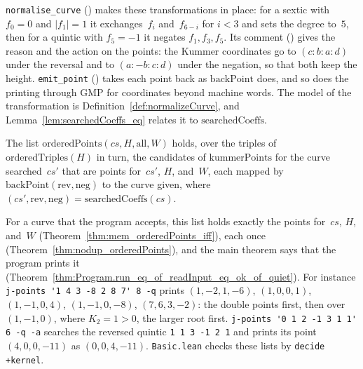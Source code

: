 \begin{remark}\label{rem:specCurveC}
  \texttt{normalise\_curve} () makes these transformations in place:
  for a sextic with $f_0 = 0$ and $|f_1| = 1$ it exchanges~$f_i$ and~$f_{6-i}$ for $i < 3$ and sets
  the degree to~$5$, then for a quintic with $f_5 = -1$ it negates $f_1, f_3, f_5$. Its comment
  () gives the reason and the action on the points: the Kummer
  coordinates go to $(c : b : a : d)$ under the reversal and to $(a : -b : c : d)$ under the
  negation, so that both keep the height. \texttt{emit\_point} ()
  takes each point back as $\mathrm{backPoint}$ does, and so does the printing through GMP for
  coordinates beyond machine words. The model of the transformation is
  Definition~\ref{def:normalizeCurve}, and Lemma~\ref{lem:searchedCoeffs_eq} relates it to
  $\mathrm{searchedCoeffs}$.
\end{remark}

\begin{definition}\label{def:orderedPoints}
  \leanok
  The list $\mathrm{orderedPoints}(cs, H, \mathrm{all}, W)$ holds, over the triples of
  $\mathrm{orderedTriples}(H)$ in turn, the candidates of $\mathrm{kummerPoints}$ for the curve
  searched~$cs'$ that are points for~$cs'$, $H$,  and~$W$, each mapped by
  $\mathrm{backPoint}(\mathrm{rev}, \mathrm{neg})$ to the curve given, where
  $(cs', \mathrm{rev}, \mathrm{neg}) = \mathrm{searchedCoeffs}(cs)$.
\end{definition}

For a curve that the program accepts, this list holds exactly the points for~$cs$, $H$,
 and~$W$ (Theorem~\ref{thm:mem_orderedPoints_iff}), each once
(Theorem~\ref{thm:nodup_orderedPoints}), and the main theorem says that the program prints it
(Theorem~\ref{thm:Program.run_eq_of_readInput_eq_ok_of_quiet}). For instance
\verb|j-points '1 4 3 -8 2 8 7' 8 -q| prints $(1, -2, 1, -6)$, $(1, 0, 0, 1)$, $(1, -1, 0, 4)$,
$(1, -1, 0, -8)$, $(7, 6, 3, -2)$: the double points first, then over $(1, -1, 0)$, where
$K_2 = 1 > 0$, the larger root first. \verb|j-points '0 1 2 -1 3 1 1' 6 -q -a| searches the
reversed quintic \verb|1 1 3 -1 2 1| and prints its point $(4, 0, 0, -11)$ as $(0, 0, 4, -11)$.
\verb|Basic.lean| checks these lists by \verb|decide +kernel|.

